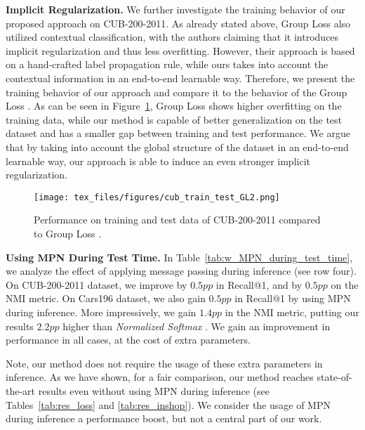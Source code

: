 \documentclass{article}
\begin{document}
\noindent\textbf{Implicit Regularization.} We further investigate the training behavior of our proposed approach on CUB-200-2011. As already stated above, Group Loss \cite{DBLP:conf/eccv/GrLoss} also utilized contextual classification, with the authors claiming that it introduces implicit regularization and thus less overfitting. However, their approach is based on a hand-crafted label propagation rule, while ours takes into account the contextual information in an end-to-end learnable way. Therefore, we present the training behavior of our approach and compare it to the behavior of the Group Loss \cite{DBLP:conf/eccv/GrLoss}.
As can be seen in Figure~\ref{fig:cub_train_test}, Group Loss \cite{DBLP:conf/eccv/GrLoss} shows higher overfitting on the training data, while our method is capable of better generalization on the test dataset and has a smaller gap between training and test performance. We argue that by taking into account the global structure of the dataset in an end-to-end learnable way, our approach is able to induce an even stronger implicit regularization.

\begin{figure}[htb]
    \vspace{-0.3cm}
    \begin{center}
    \centerline{\texttt{[image: tex\_files/figures/cub\_train\_test\_GL2.png]}}
    \caption{Performance on training and test data of CUB-200-2011 compared to Group Loss \cite{DBLP:conf/eccv/GrLoss}.}
    \label{fig:cub_train_test}
    \end{center}
    \vspace{-0.2cm}
\end{figure}

\noindent\textbf{Using MPN During Test Time.} In Table~\ref{tab:w_MPN_during_test_time}, we analyze the effect of applying message passing during inference (see row four). On CUB-200-2011 dataset, we improve by $0.5pp$ in Recall@1, and by $0.5pp$ on the NMI metric. On Cars196 dataset, we also gain $0.5pp$ in Recall@1 by using MPN during inference. More impressively, we gain $1.4pp$ in the NMI metric, putting our results $2.2pp$ higher than \textit{Normalized Softmax} \cite{DBLP:journals/corr/abs-1811-12649}. We gain an improvement in performance in all cases, at the cost of extra parameters.

Note, our method does not require the usage of these extra parameters in inference. As we have shown, for a fair comparison, our method reaches state-of-the-art results even without using MPN during inference (see Tables~\ref{tab:res_loss} and \ref{tab:res_inshop}). We consider the usage of MPN during inference a performance boost, but not a central part of our work.
\end{document}
